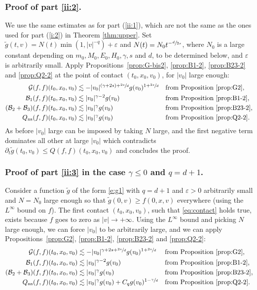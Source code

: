 \documentclass[JEP,XML,SOM,Unicode,NoFloatCountersInSection]{cedram}
\newcommand{\ns}{\mathrm{ns}}
\theoremstyle{plain}
\theoremstyle{definition}
\numberwithin{equation}{section}
\newcommand{\eps}{\varepsilon}
\let\A N
\newcommand{\Ao}{N_0}
\begin{document}
\subsubsection{Proof of part \eqref{ii:2}.} We use the same
estimates as for part (\ref{ii:1}), which are not the same as the ones
used for part (\ref{i:2}) in Theorem \ref{thm:upper}. Set
$\tilde g(t,v) = \A(t) \min(1,|v|^{-q}) + \eps$ and
$\A(t) = \Ao t^{-\sfrac d {2s}}$, where $\Ao$ is a large constant
depending on $m_0, M_0, E_0, H_0, \gamma, s$ and $d$, to be determined
below, and $\eps$ is arbitrarily small. Apply
Propositions~\ref{prop:G-bis2}, \ref{prop:B1-2}, \ref{prop:B23-2} and
\ref{prop:Q2-2} at the point of contact $(t_0,x_0,v_0)$, for $|v_0|$
large enough:
\begin{align*}
\mathcal G(f,f)(t_0,x_0,v_0) &\lesssim - |v_0|^{(\gamma+2s)+\sfrac{2s}d}
g(v_0)^{1+\sfrac{2s}d}
&& \text{from Proposition \ref{prop:G2}}, \\
\mathcal B_1(f,f)(t_0,x_0,v_0) &\lesssim |v_0|^{\gamma-2} g(v_0)
&& \text{from Proposition \ref{prop:B1-2}}, \\
(\mathcal B_2 + \mathcal B_3)(f,f)(t_0,x_0,v_0) &\lesssim |v_0|^{\gamma}
g(v_0)
&& \text{from Proposition \ref{prop:B23-2}},\\
Q_{\ns}(f,f)(t_0,x_0,v_0) &\lesssim |v_0|^\gamma g(v_0)
&& \text{from Proposition \ref{prop:Q2-2}}.
\end{align*}
As before $|v_0|$ large can be imposed by taking $\A$ large, and the
first negative term dominates all other at large $|v_0|$ which
contradicts $\partial_t \tilde g(t_0,v_0) \le Q(f,f)(t_0,x_0,v_0)$ and
concludes the proof.

\subsubsection{Proof of part \eqref{ii:3} in the case $\gamma \le 0$
and $q = d+1$.}

Consider a function $\tilde g$ of the form \eqref{e:g1} with $q=d+1$
and $\eps>0$ arbitrarily small and $\A=\Ao$ large enough so that
$\tilde g(0,v) \geq f(0,x,v)$ everywhere (using the $L^\infty$ bound on
$f$). The first contact $(t_0,x_0,v_0)$, such that \eqref{eq:contact}
holds true, exists because $f$ goes to zero as $|v| \to
+\infty$. Using the $L^\infty$ bound and picking $\A$ large enough, we
can force $|v_0|$ to be arbitrarily large, and we can apply
Propositions~\ref{prop:G2}, \ref{prop:B1-2}, \ref{prop:B23-2} and
\ref{prop:Q2-2}:
\begin{align*}
\mathcal G(f,f)(t_0,x_0,v_0) &\lesssim - |v_0|^{\gamma+2s+\sfrac{2s}d}
g(v_0)^{1+\sfrac{2s}d}
&& \text{from Proposition \ref{prop:G2}}, \\
\mathcal B_1(f,f)(t_0,x_0,v_0) &\lesssim |v_0|^{\gamma-2} g(v_0)
&& \text{from Proposition \ref{prop:B1-2}}, \\
(\mathcal B_2 + \mathcal B_3)(f,f)(t_0,x_0,v_0) &\lesssim |v_0|^{\gamma}
g(v_0)
&& \text{from Proposition \ref{prop:B23-2}},\\
Q_{\ns}(f,f)(t_0,x_0,v_0) &\lesssim |v_0|^\gamma g(v_0) + C_q g(v_0)^{1-\sfrac{\gamma}{d}}
&& \text{from Proposition \ref{prop:Q2-2}}.
\end{align*}
\end{document}
